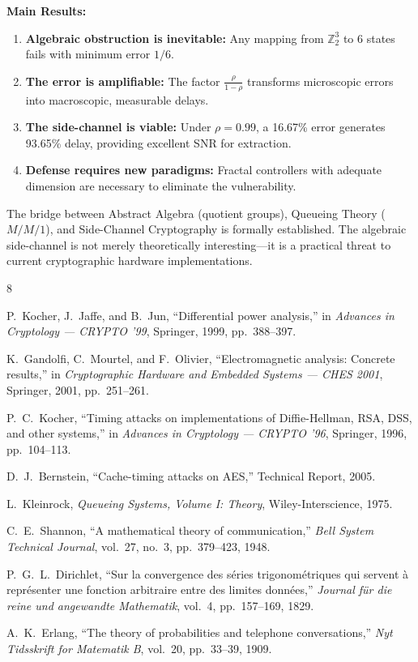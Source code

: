 \documentclass[11pt]{article}
\begin{document}
\textbf{Main Results:}
\begin{enumerate}
    \item \textbf{Algebraic obstruction is inevitable:} Any mapping from $\mathbb{Z}_2^3$ to 6 states fails with minimum error $1/6$.
    \item \textbf{The error is amplifiable:} The factor $\frac{\rho}{1-\rho}$ transforms microscopic errors into macroscopic, measurable delays.
    \item \textbf{The side-channel is viable:} Under $\rho = 0.99$, a 16.67\% error generates 93.65\% delay, providing excellent SNR for extraction.
    \item \textbf{Defense requires new paradigms:} Fractal controllers with adequate dimension are necessary to eliminate the vulnerability.
\end{enumerate}

The bridge between Abstract Algebra (quotient groups), Queueing Theory ($M/M/1$), and Side-Channel Cryptography is formally established. The algebraic side-channel is not merely theoretically interesting---it is a practical threat to current cryptographic hardware implementations.

\begin{thebibliography}{8}

P.~Kocher, J.~Jaffe, and B.~Jun,
``Differential power analysis,''
in \textit{Advances in Cryptology --- CRYPTO '99},
Springer, 1999, pp.~388--397.

K.~Gandolfi, C.~Mourtel, and F.~Olivier,
``Electromagnetic analysis: Concrete results,''
in \textit{Cryptographic Hardware and Embedded Systems --- CHES 2001},
Springer, 2001, pp.~251--261.

P.~C.~Kocher,
``Timing attacks on implementations of Diffie-Hellman, RSA, DSS, and other systems,''
in \textit{Advances in Cryptology --- CRYPTO '96},
Springer, 1996, pp.~104--113.

D.~J.~Bernstein,
``Cache-timing attacks on AES,''
Technical Report, 2005.

L.~Kleinrock,
\textit{Queueing Systems, Volume I: Theory},
Wiley-Interscience, 1975.

C.~E.~Shannon,
``A mathematical theory of communication,''
\textit{Bell System Technical Journal}, vol.~27, no.~3, pp.~379--423, 1948.

P.~G.~L.~Dirichlet,
``Sur la convergence des s\'{e}ries trigonom\'{e}triques qui servent \`{a} repr\'{e}senter une fonction arbitraire entre des limites donn\'{e}es,''
\textit{Journal f\"{u}r die reine und angewandte Mathematik}, vol.~4, pp.~157--169, 1829.

A.~K.~Erlang,
``The theory of probabilities and telephone conversations,''
\textit{Nyt Tidsskrift for Matematik B}, vol.~20, pp.~33--39, 1909.

\end{thebibliography}
\end{document}
